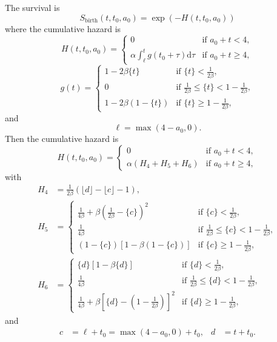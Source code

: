 \documentclass{article}
\newcommand{\md}{\mathrm{d}}
\begin{document}
The survival is
\begin{equation}
  S_{\text{birth}}(t, t_0, a_0) = \exp\left(- H(t, t_0, a_0)\right)
\end{equation}
where the cumulative hazard is
\begin{equation}
  H(t, t_0, a_0) =
  \begin{cases}
    0 & \text{if $a_0 + t < 4$},
    \\
    \alpha \int_{\ell}^t g(t_0 + \tau) \md \tau & \text{if $a_0 + t \geq 4$},
  \end{cases}
\end{equation}
\begin{equation}
  g (t) =
  \begin{cases}
    1 - 2 \beta \{t\}
    & \text{if $\{t\} < \frac{1}{2 \beta}$},
    \\
    0 & \text{if $\frac{1}{2 \beta} \leq \{t\} < 1 - \frac{1}{2 \beta}$},
    \\
    1 - 2 \beta (1 - \{t\})
    & \text{if $\{t\} \geq 1 - \frac{1}{2 \beta}$},
  \end{cases}
\end{equation}
and
\begin{equation}
  \ell = \max(4 - a_0, 0).
\end{equation}
Then the cumulative hazard is
\begin{equation}
  H(t, t_0, a_0) =
  \begin{cases}
    0 & \text{if $a_0 + t < 4$},
    \\
    \alpha \left(H_4 + H_5 + H_6\right) & \text{if $a_0 + t \geq 4$},
  \end{cases}
\end{equation}
with
\begin{align}
  H_4 &= \frac{1}{2 \beta}
  \left(\lfloor d \rfloor - \lfloor c \rfloor - 1\right),
  \\
  H_5 &=
  \begin{cases}
    \frac{1}{4 \beta}
    + \beta \left(\frac{1}{2 \beta} - \{c\}\right)^2
    & \text{if $\{c\} < \frac{1}{2 \beta}$},
    \\
    \frac{1}{4 \beta}
    & \text{if $\frac{1}{2 \beta} \leq \{c\} < 1 - \frac{1}{2 \beta}$},
    \\
    \left(1 - \{c\}\right) \left[1 -
      \beta \left(1 - \{c\}\right)\right]
    & \text{if $\{c\} \geq 1 - \frac{1}{2 \beta}$},
  \end{cases}
  \\
  H_6 &=
  \begin{cases}
    \{d\} \left[1 - \beta \{d\}\right]
    & \text{if $\{d\} < \frac{1}{2 \beta}$},
    \\
    \frac{1}{4 \beta}
    & \text{if $\frac{1}{2 \beta} \leq \{d\} <
      1 - \frac{1}{2 \beta}$},
    \\
    \frac{1}{4 \beta}
    + \beta
    \left[\{d\} - \left(1 - \frac{1}{2 \beta}\right)\right]^2
    & \text{if $\{d\} \geq 1 - \frac{1}{2 \beta}$},
  \end{cases}
\end{align}
and
\begin{align}
  c &= \ell + t_0 = \max(4 - a_0, 0) + t_0,
  &
  d &= t + t_0.
\end{align}
\end{document}
